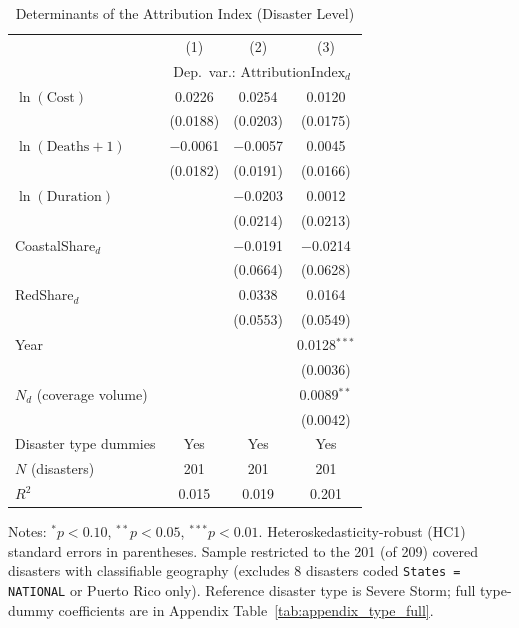 \documentclass[12pt]{article}
\begin{document}
\begin{table}[ht]
\centering
\caption{Determinants of the Attribution Index (Disaster Level)}
\label{tab:main_results}
\begin{threeparttable}
\begin{tabular}{lccc}
\toprule
 & (1) & (2) & (3) \\
 & \multicolumn{3}{c}{Dep.\ var.: $\text{AttributionIndex}_d$} \\
\midrule
$\ln(\text{Cost})$        & 0.0226   & 0.0254   & 0.0120   \\
                          & (0.0188) & (0.0203) & (0.0175) \\
$\ln(\text{Deaths}+1)$    & $-$0.0061 & $-$0.0057 & 0.0045   \\
                          & (0.0182) & (0.0191) & (0.0166) \\
$\ln(\text{Duration})$    &          & $-$0.0203 & 0.0012   \\
                          &          & (0.0214) & (0.0213) \\
CoastalShare$_d$          &          & $-$0.0191 & $-$0.0214 \\
                          &          & (0.0664) & (0.0628) \\
RedShare$_d$              &          & 0.0338   & 0.0164   \\
                          &          & (0.0553) & (0.0549) \\
Year                      &          &          & 0.0128$^{***}$ \\
                          &          &          & (0.0036) \\
$N_d$ (coverage volume)   &          &          & 0.0089$^{**}$  \\
                          &          &          & (0.0042) \\
\midrule
Disaster type dummies & Yes & Yes & Yes \\
$N$ (disasters)        & 201 & 201 & 201 \\
$R^2$                  & 0.015 & 0.019 & 0.201 \\
\bottomrule
\end{tabular}
\begin{tablenotes}
\small
\item Notes: $^{*}p<0.10$, $^{**}p<0.05$, $^{***}p<0.01$.
Heteroskedasticity-robust (HC1) standard errors in parentheses. Sample
restricted to the 201 (of 209) covered disasters with classifiable
geography (excludes 8 disasters coded \texttt{States = NATIONAL} or
Puerto Rico only). Reference disaster type is Severe Storm; full
type-dummy coefficients are in Appendix
Table~\ref{tab:appendix_type_full}.
\end{tablenotes}
\end{threeparttable}
\end{table}
\end{document}
